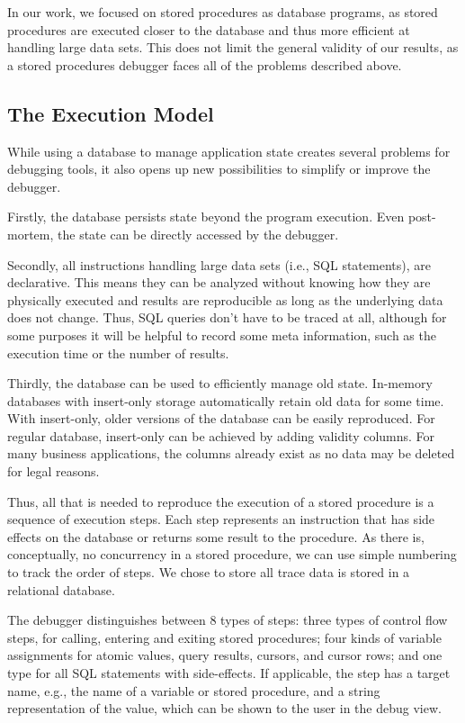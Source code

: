 \documentclass[english]{sig-alternate-05-2015}
\begin{document}
In our work, we focused on stored procedures as database programs, as stored procedures are executed closer to the database and thus more efficient at handling large data sets.
This does not limit the general validity of our results, as a stored procedures debugger faces all of the problems described above.

\subsection{The Execution Model}

While using a database to manage application state creates several problems for debugging tools, it also opens up new possibilities to simplify or improve the debugger.

Firstly, the database persists state beyond the program execution.
Even post-mortem, the state can be directly accessed by the debugger.

Secondly, all instructions handling large data sets (i.e., SQL statements), are declarative.
This means they can be analyzed without knowing how they are physically executed and results are reproducible as long as the underlying data does not change.
Thus, SQL queries don't have to be traced at all, although for some purposes it will be helpful to record some meta information, such as the execution time or the number of results.

Thirdly, the database can be used to efficiently manage old state.
In-memory databases with insert-only storage automatically retain old data for some time.
With insert-only, older versions of the database can be easily reproduced.
For regular database, insert-only can be achieved by adding validity columns.
For many business applications, the columns already exist as no data may be deleted for legal reasons.

Thus, all that is needed to reproduce the execution of a stored procedure is a sequence of execution steps.
Each step represents an instruction that has side effects on the database or returns some result to the procedure.
As there is, conceptually, no concurrency in a stored procedure, we can use simple numbering to track the order of steps.
We chose to store all trace data is stored in a relational database.

The debugger distinguishes between 8 types of steps:
three types of control flow steps, for calling, entering and exiting stored procedures;
four kinds of variable assignments for atomic values, query results, cursors, and cursor rows;
and one type for all SQL statements with side-effects.
If applicable, the step has a target name, e.g., the name of a variable or stored procedure, and a string representation of the value, which can be shown to the user in the debug view.
\end{document}
